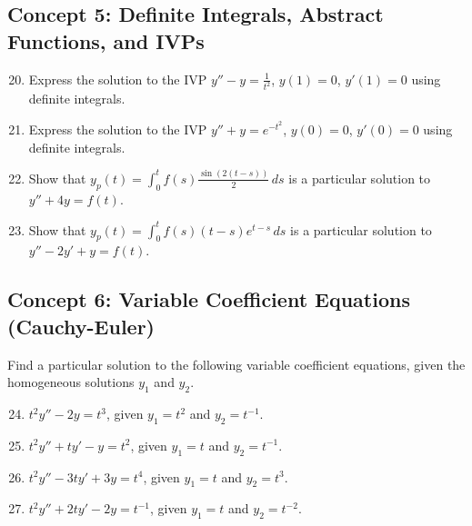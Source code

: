 \documentclass[11pt]{article}
\begin{document}
\subsection*{Concept 5: Definite Integrals, Abstract Functions, and IVPs}
\begin{enumerate}
    \setcounter{enumi}{19}
    \item Express the solution to the IVP $y'' - y = \frac{1}{t^2}$, $y(1) = 0$, $y'(1) = 0$ using definite integrals.
    \item Express the solution to the IVP $y'' + y = e^{-t^2}$, $y(0) = 0$, $y'(0) = 0$ using definite integrals.
    \item Show that $y_p(t) = \int_0^t f(s) \frac{\sin(2(t-s))}{2} \, ds$ is a particular solution to $y'' + 4y = f(t)$.
    \item Show that $y_p(t) = \int_0^t f(s) (t-s)e^{t-s} \, ds$ is a particular solution to $y'' - 2y' + y = f(t)$.
\end{enumerate}

\subsection*{Concept 6: Variable Coefficient Equations (Cauchy-Euler)}
Find a particular solution to the following variable coefficient equations, given the homogeneous solutions $y_1$ and $y_2$.
\begin{enumerate}
    \setcounter{enumi}{23}
    \item $t^2 y'' - 2y = t^3$, given $y_1 = t^2$ and $y_2 = t^{-1}$.
    \item $t^2 y'' + t y' - y = t^2$, given $y_1 = t$ and $y_2 = t^{-1}$.
    \item $t^2 y'' - 3t y' + 3y = t^4$, given $y_1 = t$ and $y_2 = t^3$.
    \item $t^2 y'' + 2t y' - 2y = t^{-1}$, given $y_1 = t$ and $y_2 = t^{-2}$.
\end{enumerate}
\end{document}
